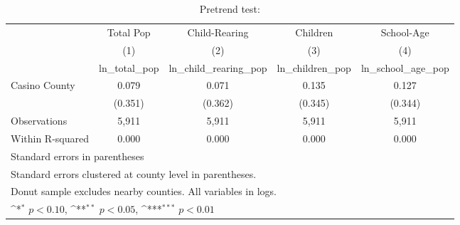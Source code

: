 \begin{table}[htbp]\centering
\def\sym#1{\ifmmode^{#1}\else\(^{#1}\)\fi}
\caption{Pretrend test:}
\begin{tabular}{l*{4}{c}}
\hline\hline
            &\multicolumn{1}{c}{Total Pop}&\multicolumn{1}{c}{Child-Rearing}&\multicolumn{1}{c}{Children}&\multicolumn{1}{c}{School-Age}\\\cmidrule(lr){2-2}\cmidrule(lr){3-3}\cmidrule(lr){4-4}\cmidrule(lr){5-5}
            &\multicolumn{1}{c}{(1)}&\multicolumn{1}{c}{(2)}&\multicolumn{1}{c}{(3)}&\multicolumn{1}{c}{(4)}\\
            &\multicolumn{1}{c}{ln\_total\_pop}&\multicolumn{1}{c}{ln\_child\_rearing\_pop}&\multicolumn{1}{c}{ln\_children\_pop}&\multicolumn{1}{c}{ln\_school\_age\_pop}\\
\hline
Casino County&       0.079         &       0.071         &       0.135         &       0.127         \\
            &     (0.351)         &     (0.362)         &     (0.345)         &     (0.344)         \\
\hline
Observations&       5,911         &       5,911         &       5,911         &       5,911         \\
Within R-squared&       0.000         &       0.000         &       0.000         &       0.000         \\
\hline\hline
\multicolumn{5}{l}{\footnotesize Standard errors in parentheses}\\
\multicolumn{5}{l}{\footnotesize Standard errors clustered at county level in parentheses.}\\
\multicolumn{5}{l}{\footnotesize Donut sample excludes nearby counties. All variables in logs.}\\
\multicolumn{5}{l}{\footnotesize \sym{*} \(p<0.10\), \sym{**} \(p<0.05\), \sym{***} \(p<0.01\)}\\
\end{tabular}
\end{table}
